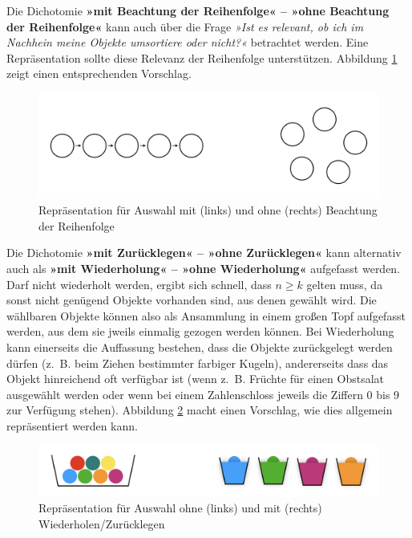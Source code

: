 \documentclass[
]{scrbook}
\theoremstyle{definition}
\theoremstyle{definition}
\theoremstyle{definition}
\theoremstyle{definition}
\theoremstyle{remark}
\begin{document}
Die Dichotomie \textbf{»mit Beachtung der Reihenfolge« -- »ohne Beachtung der Reihenfolge«} kann auch über die Frage \emph{»Ist es relevant, ob ich im Nachhein meine Objekte umsortiere oder nicht?«} betrachtet werden. Eine Repräsentation sollte diese Relevanz der Reihenfolge unterstützen. Abbildung \ref{fig:Reihenfolge} zeigt einen entsprechenden Vorschlag.

\begin{figure}

{\centering \includegraphics[width=0.75\linewidth]{pictures/10-Reihenfolge} 

}

\caption{Repräsentation für Auswahl mit (links) und ohne (rechts) Beachtung der Reihenfolge}\label{fig:Reihenfolge}
\end{figure}

Die Dichotomie \textbf{»mit Zurücklegen« -- »ohne Zurücklegen«} kann alternativ auch als \textbf{»mit Wiederholung« -- »ohne Wiederholung«} aufgefasst werden. Darf nicht wiederholt werden, ergibt sich schnell, dass \(n\geq k\) gelten muss, da sonst nicht genügend Objekte vorhanden sind, aus denen gewählt wird. Die wählbaren Objekte können also als Ansammlung in einem großen Topf aufgefasst werden, aus dem sie jweils einmalig gezogen werden können. Bei Wiederholung kann einerseits die Auffassung bestehen, dass die Objekte zurückgelegt werden dürfen (z.~B. beim Ziehen bestimmter farbiger Kugeln), andererseits dass das Objekt hinreichend oft verfügbar ist (wenn z.~B. Früchte für einen Obstsalat ausgewählt werden oder wenn bei einem Zahlenschloss jeweils die Ziffern 0 bis 9 zur Verfügung stehen). Abbildung \ref{fig:Wiederholung} macht einen Vorschlag, wie dies allgemein repräsentiert werden kann.

\begin{figure}

{\centering \includegraphics[width=0.75\linewidth]{pictures/10-Wiederholung} 

}

\caption{Repräsentation für Auswahl ohne (links) und mit (rechts) Wiederholen/Zurücklegen}\label{fig:Wiederholung}
\end{figure}
\end{document}
